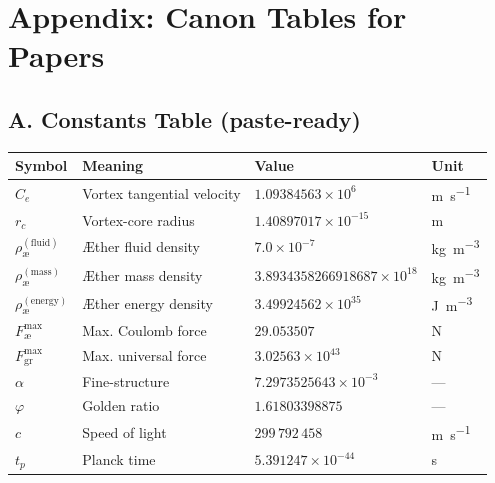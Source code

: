 \documentclass[11pt,a4paper]{article}
\begin{document}
    \section{Appendix: Canon Tables for Papers}
    \subsection*{A. Constants Table (paste-ready)}
    \begin{center}
        \begin{tabular}{@{}llll@{}}
            \toprule
            \textbf{Symbol} & \textbf{Meaning} & \textbf{Value} & \textbf{Unit} \\
            \midrule
            $C_e$ & Vortex tangential velocity & $1.09384563\times 10^{6}$ & \si{m.s^{-1}} \\
            $r_c$ & Vortex-core radius & $1.40897017\times 10^{-15}$ & \si{m} \\
            $\rho_{\text{\ae}}^{(\text{fluid})}$ & Æther fluid density & $7.0\times 10^{-7}$ & \si{kg.m^{-3}} \\
            $\rho_{\text{\ae}}^{(\text{mass})}$ & Æther mass density & $3.8934358266918687\times 10^{18}$ & \si{kg.m^{-3}} \\
            $\rho_{\text{\ae}}^{(\text{energy})}$ & Æther energy density & $3.49924562\times 10^{35}$ & \si{J.m^{-3}} \\
            $F_{\text{\ae}}^{\max}$ & Max. Coulomb force & $29.053507$ & \si{N} \\
            $F_{\text{gr}}^{\max}$ & Max. universal force & $3.02563\times 10^{43}$ & \si{N} \\
            $\alpha$ & Fine-structure & $7.2973525643\times 10^{-3}$ & — \\
            $\varphi$ & Golden ratio & $1.61803398875$ & — \\
            $c$ & Speed of light & $299\,792\,458$ & \si{m.s^{-1}} \\
            $t_p$ & Planck time & $5.391247\times 10^{-44}$ & \si{s} \\
            \bottomrule
        \end{tabular}
    \end{center}
\end{document}
